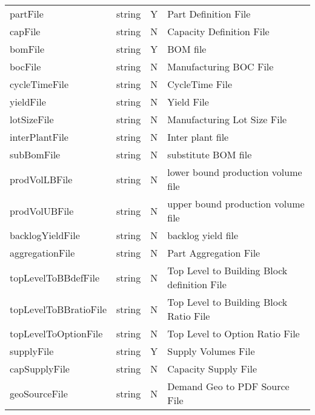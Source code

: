 \begin{minipage}{7.5in}
\begin{tabular}{lllp{3.5in}}
partFile         & string &  Y  &  Part Definition File\\
capFile          & string &  N  &  Capacity Definition File \\
bomFile          & string &  Y  &  BOM file\\
bocFile          & string &  N  &  Manufacturing BOC File \\
cycleTimeFile    & string &  N  &  CycleTime File\\
yieldFile        & string &  N  &  Yield File\\
lotSizeFile      & string &  N  &  Manufacturing Lot Size File \\
interPlantFile   & string &  N  &  Inter plant file \\
subBomFile       & string &  N  &  substitute BOM file\\
prodVolLBFile    & string &  N  &  lower bound production volume file \\
prodVolUBFile    & string &  N  &  upper bound production volume file \\
backlogYieldFile & string &  N  &  backlog yield file \\
aggregationFile  & string &  N  &  Part Aggregation File\\
topLevelToBBdefFile & string & N & Top Level to Building Block 
          definition File \\  
topLevelToBBratioFile & string & N & Top Level to Building Block Ratio File \\ 
topLevelToOptionFile & string & N & Top Level to Option Ratio File \\ 
supplyFile       & string &  Y  &  Supply Volumes File\\
capSupplyFile    & string &  N  &  Capacity Supply File \\

geoSourceFile    & string &  N  &  Demand Geo to PDF Source File
\end{tabular}
\end{minipage}

\vspace{0.5in}

